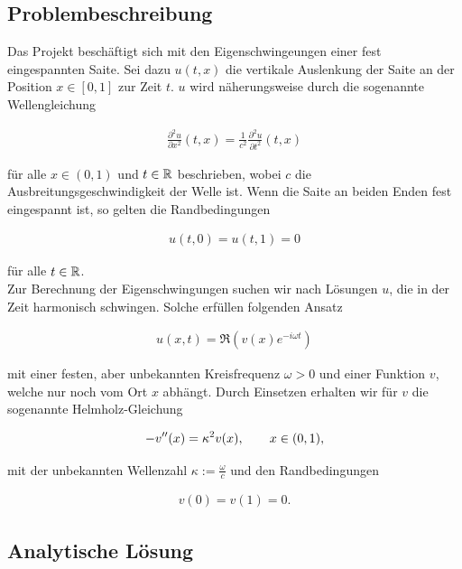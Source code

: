 \subsection{Problembeschreibung}

Das Projekt beschäftigt sich mit den Eigenschwingeungen einer fest eingespannten Saite. Sei dazu $u(t, x)$ die vertikale Auslenkung der Saite an der Position $x \in [0, 1]$ zur Zeit $t$. $u$ wird näherungsweise durch die sogenannte Wellengleichung

\begin{align} \label{Wellengleichung}
  \frac{\partial^2 u}{\partial x^2} (t, x) =
  \frac{1}{c^2}
  \frac{\partial^2 u}{\partial t^2} (t, x)
\end{align}

für alle $x \in (0, 1)$ und $t \in \mathbb{R}$ beschrieben, wobei $c$ die Ausbreitungsgeschwindigkeit der Welle ist. Wenn die Saite an beiden Enden fest eingespannt ist, so gelten die Randbedingungen

\begin{align*}
  u(t, 0) = u(t, 1) = 0
\end{align*}

für alle $t \in \mathbb{R}$. \\

Zur Berechnung der Eigenschwingungen suchen wir nach Lösungen $u$, die in der Zeit harmonisch schwingen. Solche erfüllen folgenden Ansatz

\begin{align*}
  u(x, t) = \Re (v(x) e^{-i \omega t})
\end{align*}

mit einer festen, aber unbekannten Kreisfrequenz $\omega > 0$ und einer Funktion $v$, welche nur noch vom Ort $x$ abhängt. Durch Einsetzen erhalten wir für $v$ die sogenannte Helmholz-Gleichung

\begin{align} \label{Helmholz-Gleichung}
  -v^{\prime \prime}(x) = \kappa^2 v(x), \qquad
  x \in (0, 1),
\end{align}

mit der unbekannten Wellenzahl $\kappa := \frac{\omega}{c}$ und den Randbedingungen

\begin{align} \label{Randbedingungen}
  v(0) = v(1) = 0.
\end{align}

\subsection{Analytische Lösung}

